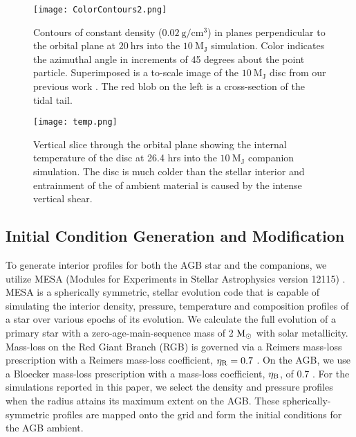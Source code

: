 \documentclass[fleqn,usenatbib]{mnras}
\begin{document}
\begin{figure*}
    \centering
    \texttt{[image: ColorContours2.png]}
    \caption{Contours of constant density ($\mathrm{0.02\ \mathrm{g/cm^3}}$) in planes perpendicular to the orbital plane at $\mathrm{20\ hrs}$ into the $10\  \mathrm{M_J}$ simulation. Color indicates the azimuthal angle in increments of 45 degrees about the point particle. Superimposed is a to-scale image of the $10\ \mathrm{M_J}$ disc from our previous work \citep{Guidarelli2019}. The red blob on the left is a cross-section of the tidal tail.}
    \label{fig:contours}
\end{figure*}


\begin{figure}
    \centering
    \texttt{[image: temp.png]}
    \caption{Vertical slice through the orbital plane showing the internal temperature of the disc at 26.4 hrs into the $\mathrm{10\ M_J}$ companion simulation. The disc is much colder than the stellar interior and entrainment of the of ambient material is caused by the intense vertical shear.}
    \label{fig:temp}
\end{figure}

\subsection{Initial Condition Generation and Modification}

To generate interior profiles for both the AGB star and the companions, we utilize MESA (Modules for Experiments in Stellar Astrophysics version 12115) \citep{Paxton:2011aa,Paxton:2018aa,Paxton_2019}. MESA is a spherically symmetric, stellar evolution code that is capable of simulating the interior density, pressure, temperature and composition profiles of a star over various epochs of its evolution.  We calculate the full evolution of a primary star with a zero-age-main-sequence mass of 2 ${\rm M_\odot}$ with solar metallicity.  Mass-loss on the Red Giant Branch (RGB) is governed via a Reimers mass-loss prescription with a Reimers mass-loss coefficient, $\eta_{\rm R}=0.7$ \citep{1975MSRSL...8..369R}.  On the AGB, we use a Bloecker mass-loss prescription with a mass-loss coefficient, $\eta_{\rm B}$, of 0.7 \citep{1995A&A...297..727B}.  For the simulations reported in this paper, we select the density and pressure profiles when the radius attains its maximum extent on the AGB. These spherically-symmetric profiles are mapped onto the grid and form the initial conditions for the AGB ambient. 
\end{document}
